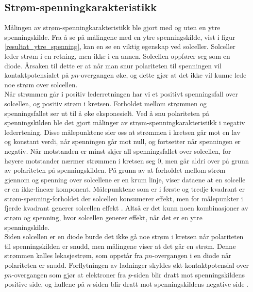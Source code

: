 \documentclass[%
 reprint,
 amsmath,amssymb,
 aps,
 norsk,
 booktabs
]{revtex4-1}
\begin{document}
\subsection{Strøm-spenningkarakteristikk}
Målingen av strøm-spenningkarakteristikk ble gjort med og uten en ytre spenningskilde. Fra å se på målingene med en ytre spenningskilde, vist i figur \vref{resultat_ytre_spenning}, kan en se en viktig egenskap ved solceller. Solceller leder strøm i en retning, men ikke i en annen. Solcellen oppfører seg som en diode. Årsaken til dette er at når man snur polariteten til spenningen vil kontaktpotensialet på $pn$-overgangen øke, og dette gjør at det ikke vil kunne lede noe strøm over solcellen.\\Når strømmen går i positiv lederretningen har vi et positivt spenningsfall over solcellen, og positiv strøm i kretsen. Forholdet mellom strømmen og spenningsfallet ser ut til å øke eksponesielt. Ved å snu polariteten på spenningskilden ble det gjort målinger av strøm-spenningkarakteristikk i negativ lederrtening. Disse målepunktene sier oss at strømmen i kretsen går mot en lav og konstant verdi, når spenningen går mot null, og fortsetter når spenningen er negativ. Når motstanden er minst skjer all spenningsfallet over solcellen, for høyere motstander nærmer strømmen i kretsen seg $0$, men går aldri over på grunn av polariteten på spenningskilden. På grunn av at forholdet mellom strøm gjennom og spenning over solcellene er en krum linje, viser dataene at en solcelle er en ikke-lineær komponent. Målepunktene som er i første og tredje kvadrant er strøm-spenning-forholdet der solcellen konsumerer effekt, men for målepunkter i fjerde kvadrant generer solcellen effekt \cite{torbj}. Altså er det kunn noen kombinasjoner av strøm og spenning, hvor solcellen generer effekt, når det er en ytre spenningskilde. \\Siden solcellen er en diode burde det ikke gå noe strøm i kretsen når polariteten til spenningskilden er snudd, men målingene viser at det går en strøm. Denne strømmen kalles lekasjestrøm, som oppstår fra $pn$-overgangen i en diode når polariteten er snudd. Forflytningen av ladninger skyldes økt kontaktpotensial over $pn$-overgangen som gjør at elektroner fra $p$-siden blir dratt mot spenningskildens positive side, og hullene på $n$-siden blir dratt mot spenningskildens negative side \cite{wiki2}. \par
\end{document}
